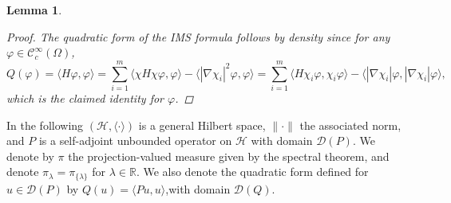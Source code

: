 \documentclass[10pt]{article}
\newcommand{\R}{\mathbb{R}}
\newcommand{\1}{\mathbbm 1}
\newtheorem{lemma}{Lemma}
\begin{document}
\begin{lemma}
\begin{proof}
            The quadratic form of the IMS formula follows by density since for any $\varphi \in \mathcal C^\infty_c(\Omega)$,
            $$
            Q(\varphi) = \langle H\varphi,\varphi\rangle = \sum_{i=1}^m \langle \chi H \chi \varphi,\varphi\rangle - \langle |\nabla\chi_i|^2\varphi,\varphi\rangle = \sum_{i=1}^m \langle H\chi_i\varphi,\chi_i\varphi\rangle - \langle |\nabla \chi_i|\varphi,|\nabla\chi_i|\varphi\rangle,
            $$
            which is the claimed identity for $\varphi$.
        \end{proof}

    \end{lemma}

    In the following $(\mathcal H,\langle\cdot\rangle)$ is a general Hilbert space, $\|\cdot\|$ the associated norm, and $P$ is a self-adjoint unbounded operator on $\mathcal H$ with domain $\mathcal D(P)$. We denote by $\pi$ the projection-valued measure given by the spectral theorem, and denote $\pi_\lambda = \pi_{\{\lambda\}}$ for $\lambda\in\R$.
    We also denote the quadratic form defined for $u\in\mathcal D(P)$ by $Q(u) = \langle Pu,u\rangle$,with domain $\mathcal D(Q)$.
\end{document}
